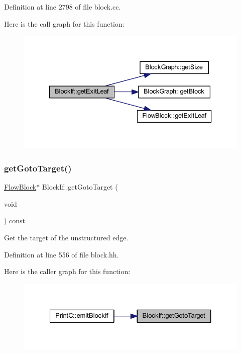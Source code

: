 Definition at line 2798 of file block.\+cc.

Here is the call graph for this function\+:
\nopagebreak
\begin{figure}[H]
\begin{center}
\leavevmode
\includegraphics[width=333pt]{class_block_if_a9adb3bd7302e374459669718f1265826_cgraph}
\end{center}
\end{figure}
\mbox{\label{class_block_if_a8fe6faa01ae8217df40b2e8a684339d7}} 
\subsubsection{\texorpdfstring{getGotoTarget()}{getGotoTarget()}}
{\footnotesize\ttfamily \mbox{\hyperlink{class_flow_block}{Flow\+Block}}$\ast$ Block\+If\+::get\+Goto\+Target (\begin{DoxyParamCaption}\item[{void}]{ }\end{DoxyParamCaption}) const\hspace{0.3cm}{\ttfamily [inline]}}



Get the target of the unstructured edge. 



Definition at line 556 of file block.\+hh.

Here is the caller graph for this function\+:
\nopagebreak
\begin{figure}[H]
\begin{center}
\leavevmode
\includegraphics[width=327pt]{class_block_if_a8fe6faa01ae8217df40b2e8a684339d7_icgraph}
\end{center}
\end{figure}
\mbox{\label{class_block_if_ad40f9c4fe01ab64decea6915bf674442}} 
